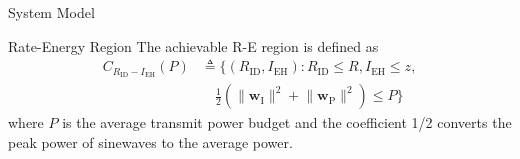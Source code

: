 \documentclass[journal]{IEEEtran}
\begin{document}
\begin{section}{System Model}
		\begin{subsection}{Rate-Energy Region}
			The achievable R-E region is defined as
			\begin{align}
				C_{R_{\mathrm{ID}}-I_{\mathrm{EH}}}(P)
				&\triangleq \biggl\{(R_{\mathrm{ID}}, I_{\mathrm{EH}}): R_{\mathrm{ID}} \le R, I_{\mathrm{EH}} \le z,\nonumber\\
				&\quad \frac{1}{2}\left(\lVert{\boldsymbol{w}_{\mathrm{I}}}\rVert^2+\lVert{\boldsymbol{w}_{\mathrm{P}}}\rVert^2\right) \le P\biggr\}
			\end{align}
			where $P$ is the average transmit power budget and the coefficient \num{1/2} converts the peak power of sinewaves to the average power.
		\end{subsection}
	\end{section}
\end{document}
